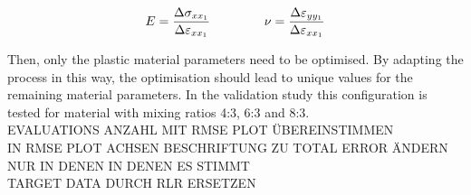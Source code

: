 \begin{gather}\label{eq: EandNu}
    E = \frac{\Delta\sigma_{xx_1}}{\Delta\varepsilon_{xx_1}} \hspace{1.5cm}
    \nu = \frac{\Delta\varepsilon_{yy_1}}{\Delta\varepsilon_{xx_1}}
\end{gather}
    
Then, only the plastic material parameters need to be optimised. By adapting the process in this way, the optimisation should lead to unique values for the remaining material parameters. In the validation study this configuration is tested for material with mixing ratios 4:3, 6:3 and 8:3. \\












EVALUATIONS ANZAHL MIT RMSE PLOT ÜBEREINSTIMMEN \\
IN RMSE PLOT ACHSEN BESCHRIFTUNG ZU TOTAL ERROR ÄNDERN NUR IN DENEN IN DENEN ES STIMMT \\
TARGET DATA DURCH RLR ERSETZEN \\





